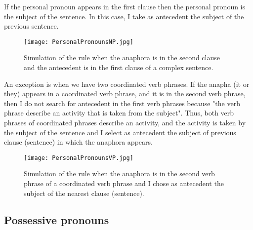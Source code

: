 If the personal pronoun appears in the first clause then the personal pronoun is the subject of the sentence. In this case, I take as antecedent the subject of the previous  sentence.

\begin{figure}[h]
  \begin{center}
	\texttt{[image: PersonalPronounsNP.jpg]} 
 	\caption[Simulation of  a rules in personal pronouns]{Simulation of  the rule when the anaphora is in the second clause and the antecedent is in the first clause of a complex sentence.}
	\label{Figure 12}
  \end{center}
\end{figure}


An exception is when we have two coordinated verb phrases. If  the anapha (it or they) appears in a coordinated verb phrase, and it is in the second verb phrase, then I do not search for antecedent in the first verb phrases because "the verb phrase describe an activity that is taken from the subject". Thus, both verb phrases of coordinated phrases describe an activity, and the activity is taken by the subject of the sentence and I select as antecedent the subject of previous clause (sentence) in which the anaphora appears. 
\newpage
\begin{figure}[h]
  \begin{center}
	\texttt{[image: PersonalPronounsVP.jpg]} 
 	\caption[Simulation of  a rules in personal pronouns]{Simulation of  the rule when the anaphora is in the second verb phrase of a coordinated verb phrase and I chose as antecedent the subject of the nearest clause (sentence).\footnotemark}
	\label{Figure 13}
  \end{center}
 \end{figure}
 


\subsection{Possessive pronouns}

